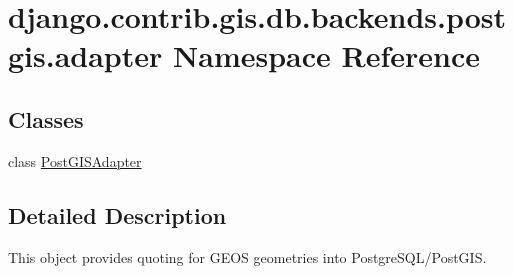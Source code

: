 \hypertarget{namespacedjango_1_1contrib_1_1gis_1_1db_1_1backends_1_1postgis_1_1adapter}{}\section{django.\+contrib.\+gis.\+db.\+backends.\+postgis.\+adapter Namespace Reference}
\label{namespacedjango_1_1contrib_1_1gis_1_1db_1_1backends_1_1postgis_1_1adapter}
\subsection*{Classes}
\begin{DoxyCompactItemize}
\item 
class \mbox{\hyperlink{classdjango_1_1contrib_1_1gis_1_1db_1_1backends_1_1postgis_1_1adapter_1_1_post_g_i_s_adapter}{Post\+G\+I\+S\+Adapter}}
\end{DoxyCompactItemize}


\subsection{Detailed Description}
\begin{DoxyVerb} This object provides quoting for GEOS geometries into PostgreSQL/PostGIS.
\end{DoxyVerb}
 